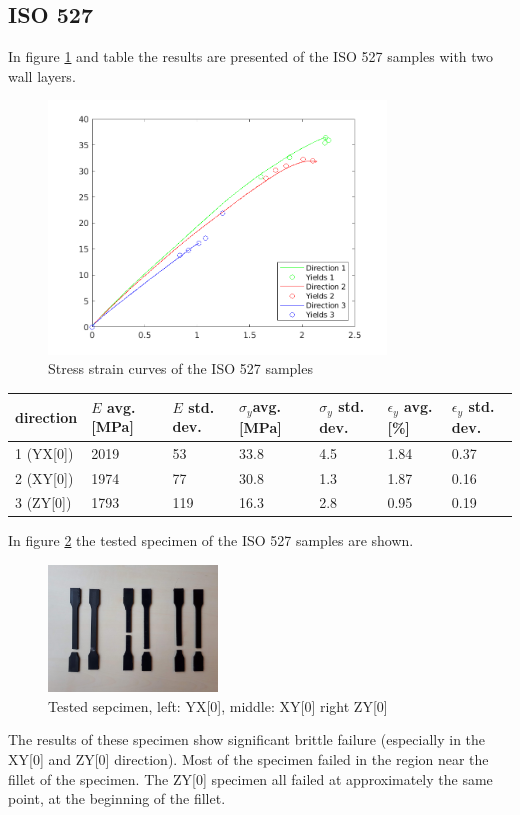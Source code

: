 \subsection{ISO 527}
In figure \ref{fig:ISO527results} and table \label{tab:ISO527results} the results are presented of the ISO 527 samples with two wall layers.
\begin{figure}[H]
    \centering
    \includegraphics[width=0.80\textwidth]{chapter_5_Experimentaltesting/figures/ISOTensiletests.png}
    \caption{Stress strain curves of the ISO 527 samples}
    \label{fig:ISO527results}
\end{figure}

\begin{tabular}{ |p{1.5cm}||p{1cm}|p{1cm}|p{1cm}|p{1cm}|p{1cm}|p{1cm}|  }
 \hline
direction & $E$ avg. [MPa] & $E$ std. dev. & $\sigma_y$avg. [MPa] & $\sigma_y$ std. dev. & $\epsilon_y$ avg. [\%] & $\epsilon_y$   std. dev. \\
 \hline
1 (YX[0]) & 2019 & 53 & 33.8 & 4.5 & 1.84 & 0.37 \\
2 (XY[0]) & 1974 & 77 & 30.8 & 1.3 & 1.87 & 0.16 \\
3 (ZY[0]) & 1793 & 119 & 16.3 & 2.8 & 0.95 & 0.19\\
 \hline
\end{tabular}
     \label{tab:ISO527results}



In figure \ref{fig:ISO527specimen} the tested specimen of the ISO 527 samples are shown. 
\begin{figure}[H]
    \centering
    \includegraphics[width=0.40\textwidth]{chapter_5_Experimentaltesting/figures/imageISO.jpg}
    \caption{Tested sepcimen, left: YX[0], middle: XY[0] right ZY[0]}
    \label{fig:ISO527specimen}
\end{figure}
The results of these specimen show significant brittle failure (especially in the XY[0] and ZY[0] direction). Most of the specimen failed in the region near the fillet of the specimen. The ZY[0] specimen all failed at approximately the same point, at the beginning of the fillet. 

